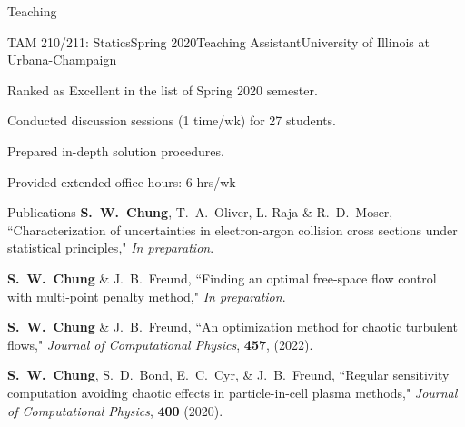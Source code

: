 \documentclass{resume} %
\begin{document}
\begin{rSection}{Teaching}


\begin{rSubsection}{TAM 210/211: Statics}{Spring 2020}{Teaching Assistant}{University of Illinois at Urbana-Champaign}
\item Ranked as Excellent in the list of Spring 2020 semester.
\item Conducted discussion sessions (1 time/wk) for 27 students.
\item Prepared in-depth solution procedures.
\item Provided extended office hours: 6 hrs/wk
\end{rSubsection}


\end{rSection}

\begin{rSection}{Publications}
\textbf{S.\ W.\ Chung}, T.\ A.\ Oliver, L. Raja \& R.\ D.\ Moser,
``Characterization of uncertainties in electron-argon collision cross sections under statistical principles,"
\textit{In preparation}.
\par
\textbf{S.\ W.\ Chung} \& J.\ B.\ Freund,
``Finding an optimal free-space flow control with multi-point penalty method,"
\textit{In preparation}.
\par
\textbf{S.\ W.\ Chung} \& J.\ B.\ Freund,
``An optimization method for chaotic turbulent flows,"
\textit{Journal of Computational Physics}, \textbf{457}, (2022).
\par
\textbf{S.\ W.\ Chung}, S.\ D.\ Bond, E.\ C.\ Cyr, \& J.\ B.\ Freund,
``Regular sensitivity computation avoiding chaotic effects in particle-in-cell plasma methods,"
\textit{Journal of Computational Physics}, \textbf{400} (2020).
\end{rSection}
\end{document}
